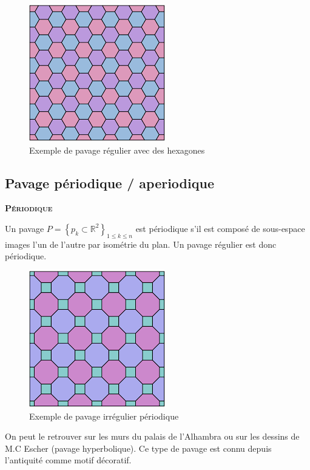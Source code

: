 \documentclass{article}
\begin{document}
\begin{figure} [h]
    \center
    \includegraphics [scale=0.5] {image/pavage_hexagonal.png}
    \caption{Exemple de pavage régulier avec des hexagones}
\end{figure}



\newpage

\subsection{Pavage périodique / aperiodique}

\hspace{1.5cm}

\textbf{\textsc{Périodique}}

Un pavage $P=\left \{ p_{k}\subset \mathbb{R}^{2} \right \}_{1\leq k\leq n}$ est périodique s'il est composé de sous-espace images l'un de l'autre par isométrie du plan.
Un pavage régulier est donc périodique.

\begin{figure} [h]
    \center
    \includegraphics [scale=0.3] {image/pavage_périodique_irrégulier.png}
    \caption{Exemple de pavage irrégulier périodique}
\end{figure}

On peut le retrouver sur les murs du palais de l'Alhambra ou sur les dessins de M.C Escher (pavage hyperbolique).
Ce type de pavage est connu depuis l’antiquité comme motif décoratif.
\end{document}
